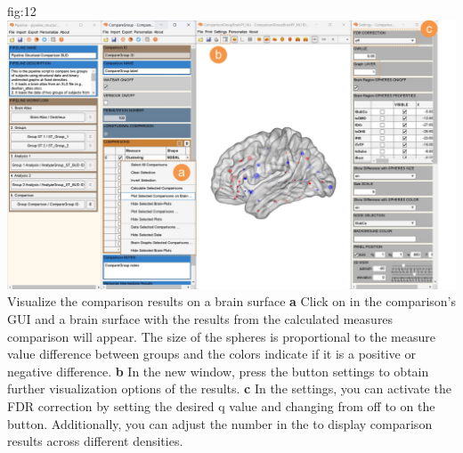 \documentclass[justified]{tufte-handout}
\begin{document}
	{fig:12}
	{\includegraphics{fig12.jpg}}
    {Visualize the comparison results on a brain surface}
    {
        {\bf a} Click on  in the comparison's GUI and a brain surface with the results from the calculated measures comparison will appear. The size of the spheres is proportional to the measure value difference between groups and the colors indicate if it is a positive or negative difference.   
        {\bf b} In the new window, press the button settings to obtain further visualization options of the results. 
        {\bf c} In the settings, you can activate the FDR correction by setting the desired q value and changing from off to on the button. Additionally, you can adjust the number in the  to display comparison results across different densities.
        }

\end{document}
